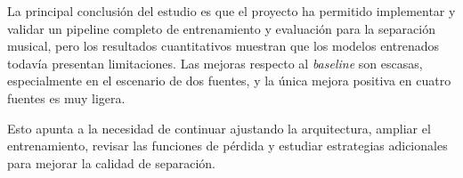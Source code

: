 La principal conclusión del estudio es que el proyecto ha permitido implementar y validar un pipeline completo de entrenamiento y evaluación para la separación musical, pero los resultados cuantitativos muestran que los modelos entrenados todavía presentan limitaciones. Las mejoras respecto al \textit{baseline} son escasas, especialmente en el escenario de dos fuentes, y la única mejora positiva en cuatro fuentes es muy ligera.

Esto apunta a la necesidad de continuar ajustando la arquitectura, ampliar el entrenamiento, revisar las funciones de pérdida y estudiar estrategias adicionales para mejorar la calidad de separación.
